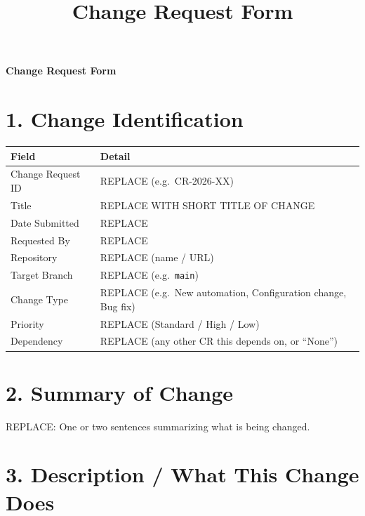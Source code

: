 \documentclass[11pt]{article}
\title{Change Request Form}
\author{}
\date{}
\begin{document}
\begin{center}
    {\LARGE \textbf{Change Request Form}}
\end{center}
\vspace{1em}

\section*{1. Change Identification}

\begin{longtable}{|p{4.5cm}|p{9.5cm}|}
\hline
\textbf{Field} & \textbf{Detail} \\
\hline
Change Request ID & REPLACE (e.g.\ CR-2026-XX) \\
\hline
Title & REPLACE WITH SHORT TITLE OF CHANGE \\
\hline
Date Submitted & REPLACE \\
\hline
Requested By & REPLACE \\
\hline
Repository & REPLACE (name / URL) \\
\hline
Target Branch & REPLACE (e.g.\ \texttt{main}) \\
\hline
Change Type & REPLACE (e.g.\ New automation, Configuration change, Bug fix) \\
\hline
Priority & REPLACE (Standard / High / Low) \\
\hline
Dependency & REPLACE (any other CR this depends on, or ``None'') \\
\hline
\end{longtable}

\section*{2. Summary of Change}

REPLACE: One or two sentences summarizing what is being changed.

\section*{3. Description / What This Change Does}
\end{document}
